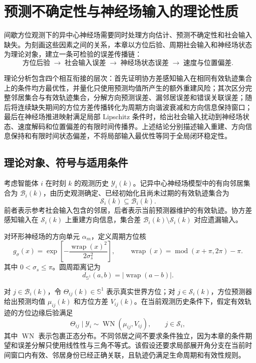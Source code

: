 \documentclass[UTF8,fontset=windows,11pt]{ctexart}
\newcommand{\Sone}{\mathbb S^1}
\begin{document}
\section{预测不确定性与神经场输入的理论性质}

间歇方位观测下的异中心神经场需要同时处理方向估计、预测不确定性和社会输入缺失。为刻画这些因素之间的关系，本章以方位后验、周期社会输入和神经场状态为理论对象，建立一条可检验的误差传播链：
\[
\text{方位后验}\;\longrightarrow\;\text{社会输入误差}\;\longrightarrow\;\text{神经场状态误差}\;\longrightarrow\;\text{速度与位置偏差}.
\]

理论分析包含四个相互衔接的层次：首先证明协方差感知输入在相同有效轨迹集合上的条件均方最优性，并量化只使用预测均值所产生的额外重建风险；其次区分完整邻居集合与有效轨迹集合，分解方向预测误差、漏邻居误差和错误关联误差；随后将连续缺失期间的方位方差传播转化为周期方向谐波衰减和方向信息保持窗口；最后在神经场推进映射满足局部 Lipschitz 条件时，给出社会输入扰动到神经场状态、速度解码和位置偏差的有限时间传播界。上述结论分别描述输入重建、方向信息保持和有限时间状态偏差，不将局部输入最优性等同于全局闭环稳定性。

\subsection{理论对象、符号与适用条件}

考虑智能体 $i$ 在时刻 $k$ 的观测历史 $\mathcal Y_i(k)$。记异中心神经场模型中的有向邻居集合为 $\mathcal B_i(k)$，由历史观测确定、已经初始化且尚未过期的有效轨迹集合为
\[
\mathcal S_i(k)\subseteq\mathcal B_i(k).
\]
前者表示参考社会输入包含的邻居，后者表示当前预测器维护的有效轨迹。协方差感知输入在 $\mathcal S_i(k)$ 上重建方向信息，集合差 $\mathcal B_i(k)\setminus\mathcal S_i(k)$ 对应遗漏输入。

对环形神经场的方向单元 $\alpha_m$，定义周期方位核
\begin{equation}
 g_\sigma(x)=\exp\!\left[-\frac{\operatorname{wrap}(x)^2}{2\sigma_s^2}\right],
 \qquad
 \operatorname{wrap}(x)=\operatorname{mod}(x+\pi,2\pi)-\pi .
 \label{eq:v2_kernel}
\end{equation}
其中 $0<\sigma_s\leq\pi$。圆周距离记为
\begin{equation}
 d_{\Sone}(a,b)=|\operatorname{wrap}(a-b)|.
 \label{eq:v2_circle_distance}
\end{equation}

对 $j\in\mathcal B_i(k)$，令 $\Theta_{ij}(k)\in\Sone$ 表示真实世界方位；对 $j\in\mathcal S_i(k)$，方位预测器给出预测均值 $\mu_{ij}(k)$ 和方位方差 $V_{ij}(k)$。在当前观测历史条件下，假定有效轨迹的方位边缘后验满足
\begin{equation}
 \Theta_{ij}\mid\mathcal Y_i\sim\operatorname{WN}(\mu_{ij},V_{ij}),
 \qquad j\in\mathcal S_i,
 \label{eq:v2_wn_assumption}
\end{equation}
其中 $\operatorname{WN}$ 表示包裹正态分布。不同邻居之间不要求条件独立，因为本章的条件期望和误差分解只使用线性性与三角不等式。该假设还要求局部展开角分支在当前时间窗口内有效、邻居身份已经正确关联，且轨迹仍满足生命周期和有效性规则。
\end{document}
